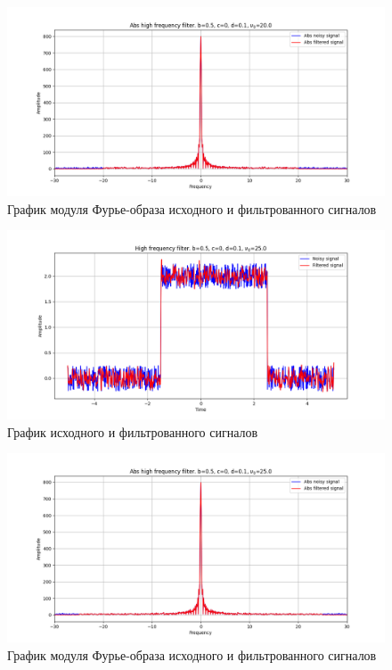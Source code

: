 \documentclass[a4paper, 16pt]{article}
\begin{document}
    \begin{figure}[!htb]
        \centering
        \includegraphics[scale=0.485]{6_abs_u_U_nohigh.png}
        \captionsetup{skip=0pt}
        \caption{График модуля Фурье-образа исходного и фильтрованного сигналов}
        \label{fig:fig16}
    \end{figure}
    \newpage
    \begin{figure}[!htb]
        \centering
        \includegraphics[scale=0.485]{10_u_flt_u_nohigh.png}
        \captionsetup{skip=0pt}
        \caption{График исходного и фильтрованного сигналов}
        \label{fig:fig17}
    \end{figure}
    \begin{figure}[!htb]
        \centering
        \includegraphics[scale=0.485]{10_abs_u_U_nohigh.png}
        \captionsetup{skip=0pt}
        \caption{График модуля Фурье-образа исходного и фильтрованного сигналов}
        \label{fig:fig18}
    \end{figure}
\end{document}

